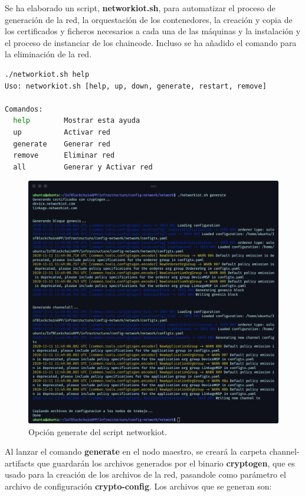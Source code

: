\noindent Se ha elaborado un script, \textbf{networkiot.sh}, para automatizar el proceso de generación de la red, la 
orquestación de los contenedores, la creación y copia de los certificados y ficheros necesarios a cada una de las 
máquinas y la instalación y el proceso de instanciar de los chaincode. Incluso se ha añadido el comando para la 
eliminación de la red. \cite{byfn, deploy-stack-swarm}

\vspace{5mm}

\begin{lstlisting}[language=bash]
./networkiot.sh help
Uso: networkiot.sh [help, up, down, generate, restart, remove]

Comandos:
  help        Mostrar esta ayuda
  up          Activar red
  generate    Generar red
  remove      Eliminar red
  all         Generar y Activar red
\end{lstlisting}

\begin{figure}[ht!]
  \centering
  \includegraphics[width=\textwidth]{imagenes/desarrollo/comandos/generate}
  \caption{Opción generate del script networkiot.}
  \label{fig:generate}
\end{figure}

\noindent Al lanzar el comando \textbf{generate} en el nodo maestro, se creará la carpeta channel-artifacts que 
guardarán los archivos generados por el binario \textbf{cryptogen}, que es usado para la creación de los archivos de la 
red, pasandole como parámetro el archivo de configuración \textbf{crypto-config}. Los archivos que se generan son:

